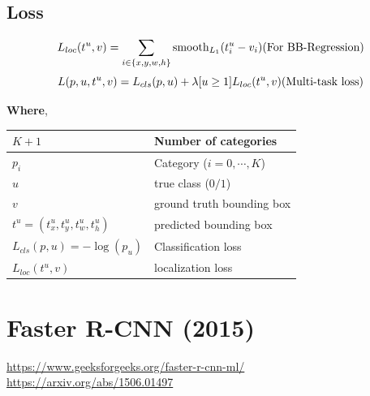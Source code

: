 \subsection*{Loss}
\[
    \displaystyle
    L_{loc}(t^u, v) = \sum_{i \in \dCurlyBrac{x,y,w,h}} \operatorname{smooth}_{L_1}(t_i^u - v_i)
    \hfill
    \text{(For BB-Regression)}
\]
\[
    \displaystyle
    L(p,u,t^u,v) = L_{cls}(p,u) + \lambda[u\geq 1]L_{loc}(t^u, v)
    \hfill
    (\text{Multi-task loss})
\]

\noindent \textbf{Where},
\begin{customTableWrapper}{1.3}
\begin{table}[h]
    \begin{tabular}{l l}
        $K+1$ & Number of categories \\ \hline

        $p_i$ & Category ($i=0,\cdots,K$) \\
        $u$ & true class ($0/1$) \\ \hline

        $v$ & ground truth bounding box \\
        $t^u = (t^u_x,t^u_y,t^u_w,t^u_h)$ & predicted bounding box \\ \hline

        $L_{cls}(p,u) = -\log(p_u)$ & Classification loss \\
        $L_{loc}(t^u,v)$ & localization loss \\
    \end{tabular}
\end{table}
\end{customTableWrapper}










\section{Faster R-CNN (2015) \cite{arxiv/1506.01497-faster-rcnn,gfg/faster-r-cnn-ml}}\label{Faster R-CNN}

\url{https://www.geeksforgeeks.org/faster-r-cnn-ml/}\\
\url{https://arxiv.org/abs/1506.01497}





























